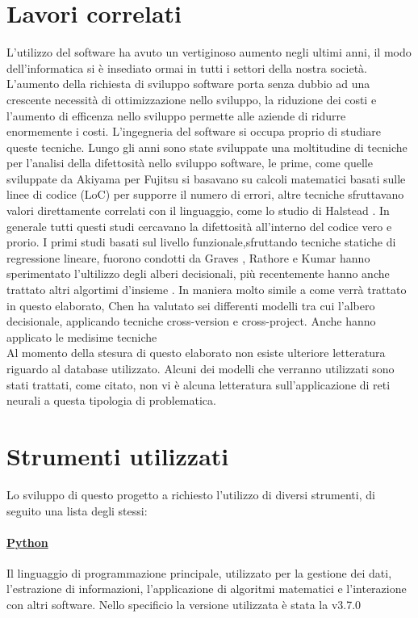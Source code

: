 \documentclass[%
    corpo=12pt,
    twoside,
    oldstyle,
    autoretitolo,
    greek,
    evenboxes,
]{toptesi}
\begin{document}
\section{Lavori correlati}
L'utilizzo del software ha avuto un vertiginoso aumento negli ultimi anni, il modo dell'informatica si è insediato ormai in tutti i settori della nostra società. L'aumento della richiesta di sviluppo software porta senza dubbio ad una crescente necessità di ottimizzazione nello sviluppo, la riduzione dei costi e l'aumento di efficenza nello sviluppo permette alle aziende di ridurre enormemente i costi. L'ingegneria del software si occupa proprio di studiare queste tecniche. Lungo gli anni sono state sviluppate una moltitudine di tecniche per l'analisi della difettosità nello sviluppo software, le prime, come quelle sviluppate da Akiyama per Fujitsu \cite{Akiyama1971AnEO} si basavano su calcoli matematici basati sulle linee di codice (LoC) per supporre il numero di errori, altre tecniche sfruttavano valori direttamente correlati con il linguaggio, come lo studio di Halstead \cite{halstead1977elements}. In generale tutti questi studi cercavano la difettosità all'interno del codice vero e prorio. I primi studi basati sul livello funzionale,sfruttando tecniche statiche di regressione lineare, fuorono condotti da Graves \cite{graves_se}, Rathore e Kumar \cite{santosh_se} hanno sperimentato l'ultilizzo degli alberi decisionali, più recentemente hanno anche trattato altri algortimi d'insieme \cite{rathore}. In maniera molto simile a come verrà trattato in questo elaborato, Chen \cite{Chen} ha valutato sei differenti modelli tra cui l'albero decisionale, applicando tecniche cross-version e cross-project. Anche \cite{super_unsuper} hanno applicato le medisime tecniche\\
Al momento della stesura di questo elaborato non esiste ulteriore letteratura riguardo al database utilizzato. Alcuni dei modelli che verranno utilizzati sono stati trattati, come citato, non vi è alcuna letteratura sull'applicazione di reti neurali a questa tipologia di problematica.

\section{Strumenti utilizzati}
Lo sviluppo di questo progetto a richiesto l'utilizzo di diversi strumenti, di seguito una lista degli stessi:

\paragraph{\href{https://www.python.org/}{Python}} Il linguaggio di programmazione principale, utilizzato per la gestione dei dati, l'estrazione di informazioni, l'applicazione di algoritmi matematici e l'interazione con altri software. Nello specificio la versione utilizzata è stata la v3.7.0
\end{document}
